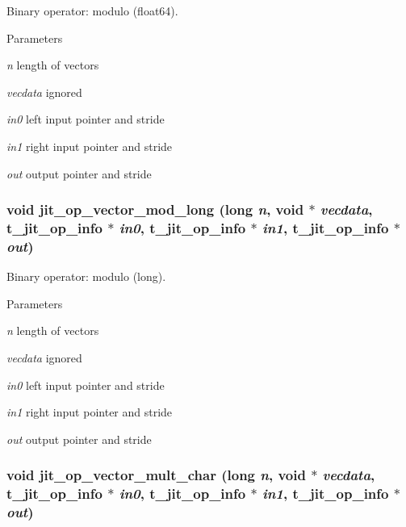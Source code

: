 Binary operator: modulo (float64). 
\begin{DoxyParams}{Parameters}
\item[{\em n}]length of vectors \item[{\em vecdata}]ignored \item[{\em in0}]left input pointer and stride \item[{\em in1}]right input pointer and stride \item[{\em out}]output pointer and stride \end{DoxyParams}
\hypertarget{group__opvecmod_gae24771094108dccd629b376122ee58ba}{
\subsubsection[{jit\_\-op\_\-vector\_\-mod\_\-long}]{\setlength{\rightskip}{0pt plus 5cm}void jit\_\-op\_\-vector\_\-mod\_\-long (long {\em n}, \/  void $\ast$ {\em vecdata}, \/  {\bf t\_\-jit\_\-op\_\-info} $\ast$ {\em in0}, \/  {\bf t\_\-jit\_\-op\_\-info} $\ast$ {\em in1}, \/  {\bf t\_\-jit\_\-op\_\-info} $\ast$ {\em out})}}
\label{group__opvecmod_gae24771094108dccd629b376122ee58ba}


Binary operator: modulo (long). 
\begin{DoxyParams}{Parameters}
\item[{\em n}]length of vectors \item[{\em vecdata}]ignored \item[{\em in0}]left input pointer and stride \item[{\em in1}]right input pointer and stride \item[{\em out}]output pointer and stride \end{DoxyParams}
\hypertarget{group__opvecmod_ga31a5c6806af3992c08dbc58650cd9e6f}{
\subsubsection[{jit\_\-op\_\-vector\_\-mult\_\-char}]{\setlength{\rightskip}{0pt plus 5cm}void jit\_\-op\_\-vector\_\-mult\_\-char (long {\em n}, \/  void $\ast$ {\em vecdata}, \/  {\bf t\_\-jit\_\-op\_\-info} $\ast$ {\em in0}, \/  {\bf t\_\-jit\_\-op\_\-info} $\ast$ {\em in1}, \/  {\bf t\_\-jit\_\-op\_\-info} $\ast$ {\em out})}}
\label{group__opvecmod_ga31a5c6806af3992c08dbc58650cd9e6f}


